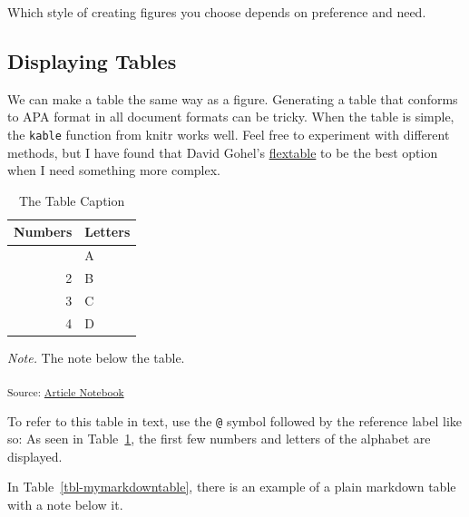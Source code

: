 \documentclass[
  jou,
  floatsintext,
  longtable,
  nolmodern,
  notxfonts,
  notimes,
  colorlinks=true,linkcolor=blue,citecolor=blue,urlcolor=blue]{apa7}
\begin{document}
Which style of creating figures you choose depends on preference and
need.

\subsection{Displaying Tables}\label{displaying-tables}

We can make a table the same way as a figure. Generating a table that
conforms to APA format in all document formats can be tricky. When the
table is simple, the \texttt{kable} function from knitr works well. Feel
free to experiment with different methods, but I have found that David
Gohel's \href{https://davidgohel.github.io/flextable/}{flextable} to be
the best option when I need something more complex.

\begin{ThreePartTable}

\begin{longtable}[]{@{}rl@{}}

\caption{\label{tbl-mytable}The Table Caption}

\tabularnewline

\toprule\noalign{}
Numbers & Letters \\
\midrule\noalign{}
\endhead
\bottomrule\noalign{}
\endlastfoot
1 & A \\
2 & B \\
3 & C \\
4 & D \\

\end{longtable}

{\noindent \emph{Note.} The note below the table.}

\end{ThreePartTable}

\textsubscript{Source:
\href{https://brainworkup.github.io/srt-manuscript/index.qmd.html}{Article
Notebook}}

To refer to this table in text, use the \texttt{@} symbol followed by
the reference label like so: As seen in Table~\ref{tbl-mytable}, the
first few numbers and letters of the alphabet are displayed.

In Table~\ref{tbl-mymarkdowntable}, there is an example of a plain
markdown table with a note below it.
\end{document}
